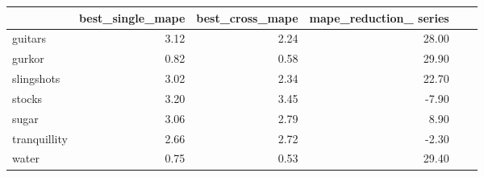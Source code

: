 \begin{tabular}{lrrr}
\toprule
 & best_single_mape & best_cross_mape & mape_reduction_%
series &  &  &  \\
\midrule
guitars & 3.12 & 2.24 & 28.00 \\
gurkor & 0.82 & 0.58 & 29.90 \\
slingshots & 3.02 & 2.34 & 22.70 \\
stocks & 3.20 & 3.45 & -7.90 \\
sugar & 3.06 & 2.79 & 8.90 \\
tranquillity & 2.66 & 2.72 & -2.30 \\
water & 0.75 & 0.53 & 29.40 \\
\bottomrule
\end{tabular}
